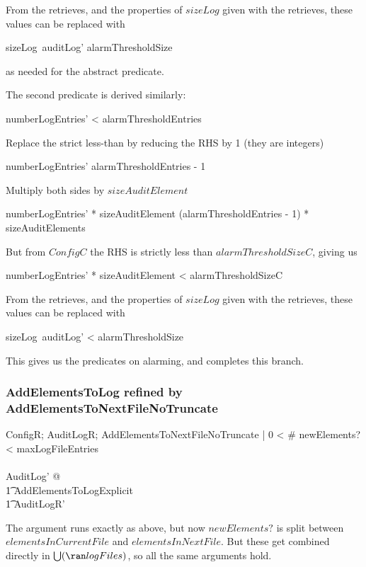 From the retrieves,
and the properties of $sizeLog$ given with the retrieves,
these values can be replaced with

\begin{argue}
	sizeLog~auditLog' \geq alarmThresholdSize
\end{argue}

as needed for the abstract predicate.

The second predicate is derived similarly:

\begin{argue}
	numberLogEntries' < alarmThresholdEntries	
\end{argue}

Replace the strict less-than by reducing the RHS by 1
(they are integers)

\begin{argue}
	numberLogEntries' \leq alarmThresholdEntries - 1
\end{argue}

Multiply both sides by $sizeAuditElement$

\begin{argue}
	numberLogEntries' * sizeAuditElement \leq (alarmThresholdEntries - 1) * sizeAuditElements	
\end{argue}

But from $ConfigC$ the RHS is strictly less than $alarmThresholdSizeC$,
giving us

\begin{argue}
	numberLogEntries' * sizeAuditElement < alarmThresholdSizeC
\end{argue}

From the retrieves,
and the properties of $sizeLog$ given with the retrieves,
these values can be replaced with

\begin{argue}
	sizeLog~auditLog' < alarmThresholdSize
\end{argue}

This gives us the predicates on alarming, and completes this branch.

\subsubsection{AddElementsToLog refined by AddElementsToNextFileNoTruncate}
\label{refine:NextFile}
\begin{zed}
ConfigR; AuditLogR; AddElementsToNextFileNoTruncate |
0 < \# newElements? < maxLogFileEntries
\\ \shows
\\ \exists AuditLog' 
@ 
\\ \t1	AddElementsToLogExplicit
\\ \t1	\land AuditLogR'
\end{zed}
The argument runs exactly as above,
but now $newElements?$ is split between $elementsInCurrentFile$ and $elementsInNextFile$.
But these get combined directly in $\bigcup (\ran logFiles)$,
so all the same arguments hold.

